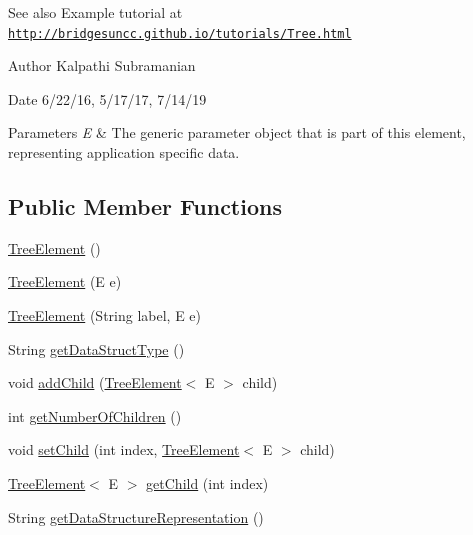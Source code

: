 \begin{DoxySeeAlso}{See also}
Example tutorial at \href{http://bridgesuncc.github.io/tutorials/Tree.html}{\tt http\+://bridgesuncc.\+github.\+io/tutorials/\+Tree.\+html}
\end{DoxySeeAlso}
\begin{DoxyAuthor}{Author}
Kalpathi Subramanian
\end{DoxyAuthor}
\begin{DoxyDate}{Date}
6/22/16, 5/17/17, 7/14/19
\end{DoxyDate}

\begin{DoxyParams}{Parameters}
{\em E} & The generic parameter object that is part of this element, representing application specific data. \\
\hline
\end{DoxyParams}
\subsection*{Public Member Functions}
\begin{DoxyCompactItemize}
\item 
\hyperlink{classbridges_1_1base_1_1_tree_element_ab1af682e9304f5427e308ba5f43d7a9a}{Tree\+Element} ()
\item 
\hyperlink{classbridges_1_1base_1_1_tree_element_a0f17c278536239fb6cba051246ef67a8}{Tree\+Element} (E e)
\item 
\hyperlink{classbridges_1_1base_1_1_tree_element_a476cbeedf2c56f6a40a632035b7d740e}{Tree\+Element} (String label, E e)
\item 
String \hyperlink{classbridges_1_1base_1_1_tree_element_a5e0d5f8991d72bd7b0e76d6b0b8662a7}{get\+Data\+Struct\+Type} ()
\item 
void \hyperlink{classbridges_1_1base_1_1_tree_element_a473c29486e99edc725423941b203e939}{add\+Child} (\hyperlink{classbridges_1_1base_1_1_tree_element}{Tree\+Element}$<$ E $>$ child)
\item 
int \hyperlink{classbridges_1_1base_1_1_tree_element_a3722c7cec66ff297f999870df0da3cff}{get\+Number\+Of\+Children} ()
\item 
void \hyperlink{classbridges_1_1base_1_1_tree_element_aefafebb19d64398d150e464e4361ddf0}{set\+Child} (int index, \hyperlink{classbridges_1_1base_1_1_tree_element}{Tree\+Element}$<$ E $>$ child)
\item 
\hyperlink{classbridges_1_1base_1_1_tree_element}{Tree\+Element}$<$ E $>$ \hyperlink{classbridges_1_1base_1_1_tree_element_a4ee40d69ce52fdcac321554564d10aa3}{get\+Child} (int index)
\item 
String \hyperlink{classbridges_1_1base_1_1_tree_element_a674870c91b39fac88d35a569fd505e9b}{get\+Data\+Structure\+Representation} ()
\end{DoxyCompactItemize}
